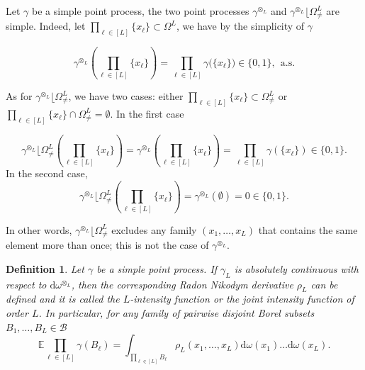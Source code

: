 \documentclass[twoside,11pt]{book}
\newtheorem{definition}{Definition}
\numberwithin{theorem}{chapter}
\numberwithin{definition}{chapter}
\numberwithin{proposition}{chapter}
\numberwithin{corollary}{chapter}
\numberwithin{example}{chapter}
\numberwithin{lemma}{chapter}
\begin{document}
Let $\gamma$ be a simple point process, the two point processes $\gamma^{\otimes_{L}}$ and $\gamma^{\otimes_{L}} \lfloor \Omega_{\neq}^{L}$ are simple. Indeed, let $\prod\limits_{\ell \in [L]} \{x_{\ell} \} \subset \Omega^{L}$, we have by the simplicity of $\gamma$

\begin{equation}
\gamma^{\otimes_{L}} (\prod\limits_{\ell \in [L]} \{x_{\ell } \}) = \prod\limits_{\ell \in [L]} \gamma\big(\{x_{\ell } \} \big) \in \{0,1\} , \:\: \text{a.s.}
\end{equation}

As for $\gamma^{\otimes_{L}} \lfloor \Omega_{\neq}^{L}$, we have two cases: either $\prod\limits_{\ell \in [L]} \{x_{\ell} \} \subset \Omega_{\neq}^{L}$ or $\prod\limits_{\ell \in [L]} \{x_{\ell} \} \cap \Omega_{\neq}^{L} = \emptyset$. In the first case

\begin{equation}
\gamma^{\otimes_{L}} \lfloor \Omega_{\neq}^{L}(\prod\limits_{\ell \in [L]} \{x_{\ell } \}) = \gamma^{\otimes_{L}} (\prod\limits_{\ell \in [L]} \{x_{\ell } \}) = \prod\limits_{\ell \in [L]} \gamma(\{x_\ell \}) \in \{ 0,1\}.
\end{equation}
In the second case, 
\begin{equation}
\gamma^{\otimes_{L}} \lfloor \Omega_{\neq}^{L}(\prod\limits_{\ell \in [L]} \{x_{\ell } \}) = \gamma^{\otimes_{L}} (\emptyset) = 0 \in \{ 0,1\}.
\end{equation}


In other words, $\gamma^{\otimes_{L}} \lfloor \Omega_{\neq}^{L}$ excludes any family $(x_{1}, \dots, x_{L})$ that contains the same element more than once; this is not the case of $\gamma^{\otimes_{L}}$.





\begin{definition}
Let $\gamma$ be a simple point process.
If $\gamma_{L}$ is absolutely continuous with respect to $\mathrm{d}\omega^{\otimes_L}$, then the corresponding Radon Nikodym derivative $\rho_{L}$ can be defined and it is called the $L$-intensity function or the joint intensity function of order $L$. In particular, for any family of pairwise disjoint Borel subsets $B_{1}, \dots, B_{L} \in \mathcal{B}$
\begin{equation}\label{eq:pointprocess_intensity_L}
\mathbb{E} \prod\limits_{\ell \in [L]} \gamma(B_{\ell}) = \int_{\prod\limits_{\ell \in [L]}B_{\ell}} \rho_{L}(x_{1}, \dots, x_{L}) \mathrm{d}\omega(x_{1}) \dots \mathrm{d}\omega(x_{L}).
\end{equation}
 \end{definition}
\end{document}
